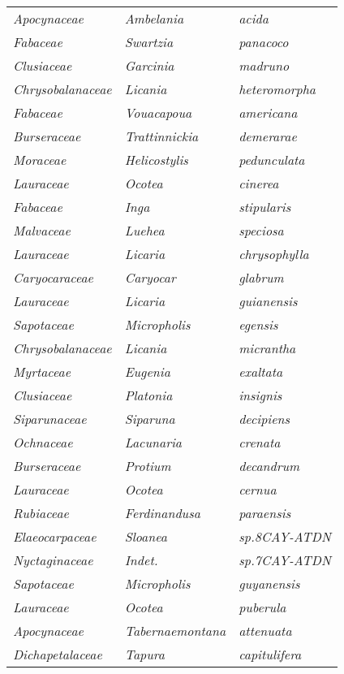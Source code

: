 \documentclass[fleqn,10pt]{ArtEcoFoG} %
\renewenvironment{table}{\begin{table*}}{\end{table*}\ignorespacesafterend}
\begin{document}
\begin{table}
\begin{tabular}[t]{lll}
\em{Apocynaceae} & \em{Ambelania} & \em{acida}\\
\addlinespace
\em{Fabaceae} & \em{Swartzia} & \em{panacoco}\\
\em{Clusiaceae} & \em{Garcinia} & \em{madruno}\\
\em{Chrysobalanaceae} & \em{Licania} & \em{heteromorpha}\\
\em{Fabaceae} & \em{Vouacapoua} & \em{americana}\\
\em{Burseraceae} & \em{Trattinnickia} & \em{demerarae}\\
\addlinespace
\em{Moraceae} & \em{Helicostylis} & \em{pedunculata}\\
\em{Lauraceae} & \em{Ocotea} & \em{cinerea}\\
\em{Fabaceae} & \em{Inga} & \em{stipularis}\\
\em{Malvaceae} & \em{Luehea} & \em{speciosa}\\
\em{Lauraceae} & \em{Licaria} & \em{chrysophylla}\\
\addlinespace
\em{Caryocaraceae} & \em{Caryocar} & \em{glabrum}\\
\em{Lauraceae} & \em{Licaria} & \em{guianensis}\\
\em{Sapotaceae} & \em{Micropholis} & \em{egensis}\\
\em{Chrysobalanaceae} & \em{Licania} & \em{micrantha}\\
\em{Myrtaceae} & \em{Eugenia} & \em{exaltata}\\
\addlinespace
\em{Clusiaceae} & \em{Platonia} & \em{insignis}\\
\em{Siparunaceae} & \em{Siparuna} & \em{decipiens}\\
\em{Ochnaceae} & \em{Lacunaria} & \em{crenata}\\
\em{Burseraceae} & \em{Protium} & \em{decandrum}\\
\em{Lauraceae} & \em{Ocotea} & \em{cernua}\\
\addlinespace
\em{Rubiaceae} & \em{Ferdinandusa} & \em{paraensis}\\
\em{Elaeocarpaceae} & \em{Sloanea} & \em{sp.8CAY-ATDN}\\
\em{Nyctaginaceae} & \em{Indet.} & \em{sp.7CAY-ATDN}\\
\em{Sapotaceae} & \em{Micropholis} & \em{guyanensis}\\
\em{Lauraceae} & \em{Ocotea} & \em{puberula}\\
\addlinespace
\em{Apocynaceae} & \em{Tabernaemontana} & \em{attenuata}\\
\em{Dichapetalaceae} & \em{Tapura} & \em{capitulifera}\\

\end{tabular}
\end{table}
\end{document}
